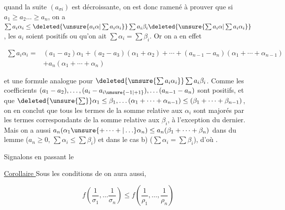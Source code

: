 
quand la suite $(a_{\sigma i})$ est décroissante, on est donc   ramené à prouver que si $a_1\geq a_2\ldots\geq a_n$, on a $\sum a_i\alpha_i\leq\deleted{\unsure{a_i\alpha|\sum a_i\alpha_i}}\sum a_i\beta_i\deleted{\unsure{\sum a_i\alpha|\sum a_i\alpha_i}}$,  les $a_i$ soient positifs  ou qu'on ait $\sum\alpha_i=\sum\beta_i$. Or on a en effet

\[
\begin{aligned}
\sum a_i\alpha_i={}&(a_1-a_2)\alpha_1+(a_2-a_3)(\alpha_1+\alpha_2)+\cdots+(a_{n-1}-a_n)(\alpha_1+\cdots+\alpha_{n-1})\\
&+a_n(\alpha_1+\cdots+\alpha_n)
\end{aligned}\tag*{(9)}
\]

 et une formule analogue pour $\deleted{\unsure{\sum a_i\alpha_i}}\sum a_i\beta_i$. Comme les coefficients $(a_1-a_2),\ldots,(a_i-a_{i\unsure{-1|+1}}),\ldots(a_{n-1}-a_n)$ sont positifs,  et que $\deleted{\unsure{\sum}}\alpha_1\leq\beta_1,\ldots(\alpha_1+\cdots+\alpha_{n-1})\leq(\beta_1+\cdots+\beta_{n-1})$, on en conclut que tous les termes de la somme relative aux $\alpha_i$ sont majorés par les termes correspondants de la somme relative aux $\beta_i$, à l'exception  du dernier. Mais on a aussi $a_n(\alpha_1\unsure{+\cdots+|\ldots}\alpha_n)\leq a_n(\beta_1+\cdots+\beta_n)$ dans  du lemme ($a_n\geq0$, $\sum\alpha_i\leq\sum\beta_i$) et dans le cas b) ($\sum\alpha_i=\sum\beta_i$), d'où .

 Signalons en passant le


\uline{Corollaire } Sous les conditions de    on aura aussi, 

\[
f\left(\frac1{\sigma_1},\ldots\frac1{\sigma_n}\right)\leq f\left(\frac1{\rho_1},\ldots,\frac1{\rho_n}\right)\tag*{(10)}
\]

